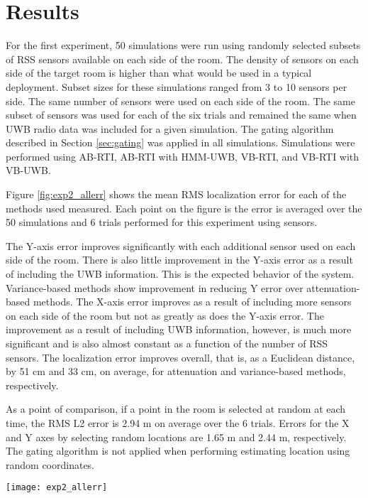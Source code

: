 \documentclass[conference]{IEEEtran}
\begin{document}
\section{Results} \label{sec:results}

For the first experiment, 50 simulations were run using randomly
selected subsets of  RSS sensors available on each side of the
room. The density of sensors on each side of the target room is higher
than what would be used in a typical deployment. Subset sizes for
these simulations ranged from 3 to 10 sensors per side. The same
number of sensors were used on each side of the room. The same subset
of sensors was used for each of the six trials and remained the same
when UWB radio data was included for a given simulation. The gating
algorithm described in Section \ref{sec:gating} was applied in all
simulations. Simulations were performed using AB-RTI, AB-RTI with
HMM-UWB, VB-RTI, and VB-RTI with VB-UWB.

Figure \ref{fig:exp2_allerr} shows the mean RMS localization error for
each of the methods used measured. Each point on the figure is the
error is averaged over the 50 simulations and 6 trials performed for
this experiment using  sensors.

The Y-axis error improves significantly with each additional sensor
used on each side of the room. There is also little improvement in the
Y-axis error as a result of including the UWB information. This is the
expected behavior of the system. Variance-based methods show
improvement in reducing Y error over attenuation-based methods.  The
X-axis error improves as a result of including more sensors on each
side of the room but not as greatly as does the Y-axis error. The
improvement as a result of including UWB information, however, is much
more significant and is also almost constant as a function of the
number of RSS sensors. The localization error improves overall, that
is, as a Euclidean distance, by 51 cm and 33 cm, on average, for
attenuation and variance-based methods, respectively.

As a point of comparison, if a point in the room is selected at random
at each time, the RMS L2 error is 2.94 m on average over the 6
trials. Errors for the X and Y axes by selecting random locations are
1.65 m and 2.44 m, respectively. The gating algorithm is not applied
when performing estimating location using random coordinates.

\begin{figure*}[htb]
    \centerline{\texttt{[image: exp2\_allerr]}}
    \caption{From left to right, the mean RMS L2, X, and Y errors over the 6 trials and 50 simulations using random subsets of  sensors per side of the study room.}
    \label{fig:exp2_allerr}
\end{figure*}
\end{document}

